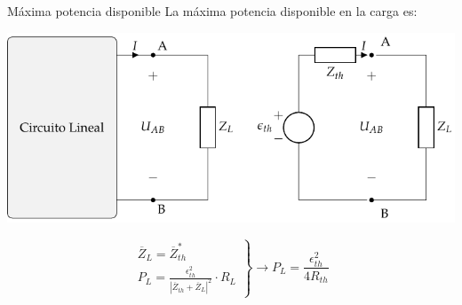 \documentclass[aspectratio=169, usenames,svgnames,dvipsnames]{beamer}
\begin{document}
\begin{frame}[label={sec:org80770e6}]{Máxima potencia disponible}
La máxima potencia disponible en la carga es:
\begin{center}
\includegraphics[height=0.45\textheight]{../figs/EquivalenteThevenin.pdf}
\end{center}

\begin{equation*}
  \left.
    \begin{matrix}
      \overline{Z}_L = \overline{Z}_{th}^*\\
      P_L = \frac{\epsilon^2_{th}}{|\overline{Z}_{th} + \overline{Z}_L|^2} \cdot R_L
    \end{matrix} \right\}\rightarrow
  \boxed{P_L = \frac{\epsilon^2_{th}}{4 R_{th}}}
\end{equation*}
\end{frame}
\end{document}
